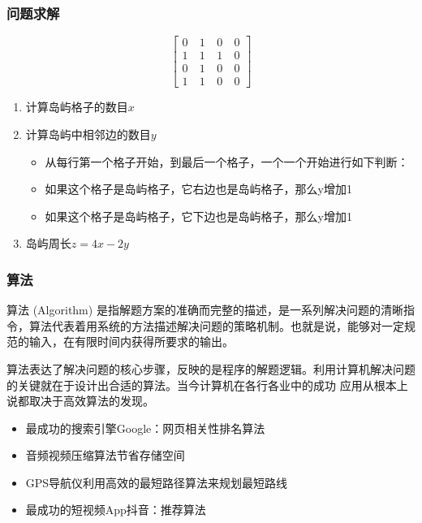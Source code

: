 \documentclass[dvipsnames, svgnames, x11names]{beamer}
\begin{document}
\begin{frame}
    \frametitle{问题求解}
    \begin{minipage}{0.28\linewidth}
        \huge{$$\begin{bmatrix}
            0~ & 1~ & 0~ & 0 \\
            1 & 1 & 1 & 0 \\
            0 & 1 & 0 & 0 \\
            1 & 1 & 0 & 0
            \end{bmatrix}$$}
    \end{minipage}\hfill
    \begin{minipage}{0.68\linewidth}
        \begin{enumerate}
          \item 计算岛屿格子的数目$x$
          \item 计算岛屿中相邻边的数目$y$
            \begin{itemize}
              \item 从每行第一个格子开始，到最后一个格子，一个一个开始进行如下判断：
              \item 如果这个格子是岛屿格子，它右边也是岛屿格子，那么y增加1
              \item 如果这个格子是岛屿格子，它下边也是岛屿格子，那么y增加1
            \end{itemize}
          \item 岛屿周长$z = 4x - 2y$
        \end{enumerate}
    \end{minipage}
\end{frame}


\begin{frame}
    \frametitle{算法}
    算法 (Algorithm) 是指解题方案的准确而完整的描述，是一系列解决问题的清晰指令，算法代表着用系统的方法描述解决问题的策略机制。也就是说，能够对一定规范的输入，在有限时间内获得所要求的输出。

    算法表达了解决问题的核心步骤，反映的是程序的解题逻辑。利用计算机解决问题的关键就在于设计出合适的算法。当今计算机在各行各业中的成功 应用从根本上说都取决于高效算法的发现。
    \begin{itemize}
      \item  最成功的搜索引擎Google：网页相关性排名算法
      \item 音频视频压缩算法节省存储空间
      \item GPS导航仪利用高效的最短路径算法来规划最短路线
      \item 最成功的短视频App抖音：推荐算法
    \end{itemize}
\end{frame}
\end{document}
